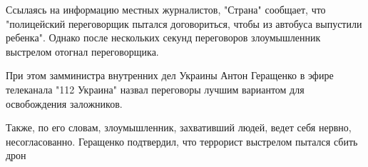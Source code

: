 Ссылаясь на информацию местных журналистов, "Страна" сообщает, что "полицейский
переговорщик пытался договориться, чтобы из автобуса выпустили ребенка". Однако
после нескольких секунд переговоров злоумышленник выстрелом отогнал
переговорщика.

При этом замминистра внутренних дел Украины Антон Геращенко в эфире телеканала
"112 Украина" назвал переговоры лучшим вариантом для освобождения заложников.

Также, по его словам, злоумышленник, захвативший людей, ведет себя нервно,
несогласованно.  Геращенко подтвердил, что террорист выстрелом пытался сбить
дрон
